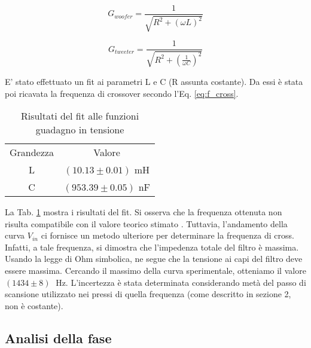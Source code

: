 \documentclass[../Relazione_circuiti]{subfiles}
\begin{document}
  \begin{equation}
    G_{woofer} = \frac{1}{\sqrt{R^2+(\omega L)^2}}
  \end{equation}

  \begin{equation}
    G_{tweeter} = \frac{1}{\sqrt{R^2+(\frac{1}{\omega C})^2}}
  \end{equation}



  E' stato effettuato un fit ai parametri L e C (R assunta costante). Da essi è stata poi ricavata la frequenza di
  crossover secondo l'Eq. \eqref{eq:f_cross}.

  \begin{table}
    \centering

    \begin{tabular}{c | c }

      Grandezza & Valore                 \\

      L         & $(10.13 \pm 0.01)$ mH  \\
      C         & $(953.39 \pm 0.05)$ nF

    \end{tabular}

    \caption{Risultati del fit alle funzioni guadagno in tensione}
    \label{tab:fit_amplitude}

  \end{table}

  La Tab. \ref{tab:fit_amplitude} mostra i risultati del fit.
  Si osserva che la frequenza ottenuta non risulta compatibile con il valore teorico stimato \theoryF.
  Tuttavia, l'andamento della curva $V_{in}$ ci fornisce un metodo ulteriore per determinare la frequenza di cross.
  Infatti, a tale frequenza, si dimostra che l'impedenza totale del filtro è massima.
  Usando la legge di Ohm simbolica, ne segue che la tensione ai capi del filtro deve essere massima.
  Cercando il massimo della curva sperimentale, otteniamo il valore $(1434 \pm 8) \;$ Hz.
  L'incertezza è stata determinata considerando metà del passo di scansione utilizzato nei pressi di quella frequenza
  (come descritto in sezione 2, non è costante).

\subsection{Analisi della fase}
\end{document}
